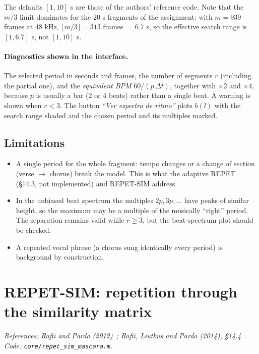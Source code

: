 \documentclass[11pt,a4paper]{article}
\newcommand{\code}[1]{\texttt{#1}}
\begin{document}
The defaults $[1,10]$ s are those of the authors' reference code. Note that
the $m/3$ limit dominates for the 20 s fragments of the assignment: with
$m=939$ frames at 48 kHz, $\lfloor m/3\rfloor=313$ frames $=6.7$ s, so the
effective search range is $[1,6.7]$ s, not $[1,10]$ s.

\paragraph{Diagnostics shown in the interface.} The selected period in
seconds and frames, the number of segments $r$ (including the partial
one), and the \emph{equivalent BPM} $60/(p\,\Delta t)$, together with
$\times2$ and $\times4$, because $p$ is usually a bar (2 or 4 beats) rather
than a single beat. A warning is shown when $r<3$. The button
\emph{``Ver espectro de ritmo''} plots $b(l)$ with the search range shaded
and the chosen period and its multiples marked.

\subsection{Limitations}
\begin{itemize}
  \item A single period for the whole fragment: tempo changes or a change
        of section (verse $\to$ chorus) break the model. This is what the
        adaptive REPET (\S14.3, not implemented) and REPET-SIM address.
  \item In the unbiased beat spectrum the multiples $2p,3p,\dots$ have
        peaks of similar height, so the maximum may be a multiple of the
        musically ``right'' period. The separation remains valid while
        $r\ge3$, but the beat-spectrum plot should be checked.
  \item A repeated vocal phrase (a chorus sung identically every period) is
        background by construction.
\end{itemize}

\section{REPET-SIM: repetition through the similarity matrix}
\label{sec:repetsim}
\noindent\textit{References: Rafii and Pardo (2012)~\cite{rafii2012};
Rafii, Liutkus and Pardo (2014), \S14.4~\cite{rafii2014}.
Code: \code{core/repet\_sim\_mascara.m}.}
\end{document}

